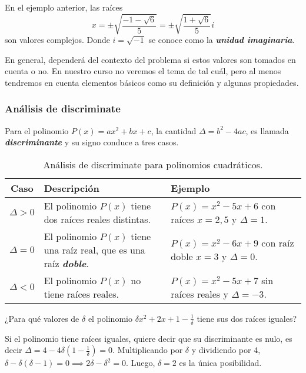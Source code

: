 En el ejemplo anterior, las raíces
\[
    x = \pm \sqrt {\frac{-1 - \sqrt{6}}{5}} = \pm \sqrt {\frac{1 + \sqrt{6}}{5}} i
\]
son valores complejos.
Donde $i = \sqrt {-1}$ se conoce como la \textbf{\emph{unidad imaginaria}}.

En general, dependerá del contexto del problema si estos valores son tomados en cuenta o no.
En nuestro curso no veremos el tema de  tal cuál, pero al menos tendremos en cuenta elementos básicos como su definición y algunas propiedades.



\subsubsection{Análisis de discriminate}

\renewcommand{\arraystretch}{1.2}

Para el polinomio $P(x) = ax^2 + bx + c$, la cantidad $\Delta = b^2 - 4ac$, es llamada \textbf{\emph{discriminante}} y su signo conduce a tres casos.
\begin{table}[H]
    \centering
    \begin{tabular}{| c | p{6.5cm} | p{6.5cm} |}
        \hline
        Caso & Descripción & Ejemplo \\ \hline
        $\Delta > 0$ & El polinomio $P(x)$ tiene dos raíces reales distintas.&
            $P(x) = x^2 - 5x + 6$ con raíces $x = 2, 5$ y $\Delta = 1$. \\\hline
        $\Delta = 0$ & El polinomio $P(x)$ tiene una raíz real, que es una raíz \textbf{\emph{doble}}.&
            $P(x) = x^2 - 6x + 9$ con raíz doble $x = 3$ y $\Delta = 0$. \\\hline
        $\Delta < 0$ & El polinomio $P(x)$ no tiene raíces reales.&
            $P(x) = x^2 - 5x + 7$ sin raíces reales y $\Delta = -3$. \\\hline
    \end{tabular}
    \caption{Análisis de discriminate para polinomios cuadráticos.}
\end{table}

\begin{example}
    ¿Para qué valores de $\delta$ el polinomio $\delta x^2 + 2x + 1 - \frac{1}{\delta}$ tiene sus dos raíces iguales?
\end{example}
\begin{solution}
    Si el polinomio tiene raíces iguales, quiere decir que su discriminante es nulo, es decir $\Delta = 4 - 4\delta \left(1 - \frac{1}{\delta}\right) = 0$.
    Multiplicando por $\delta$ y dividiendo por 4, $ \delta - \delta (\delta - 1) = 0 \implies 2\delta - \delta^2 = 0$.
    Luego, $\delta = 2$ es la única posibilidad.
\end{solution}


